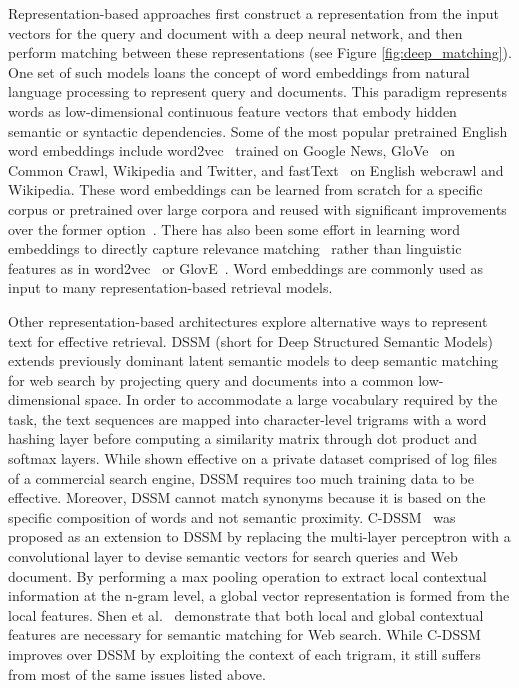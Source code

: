 Representation-based approaches first construct a representation from the input vectors for the query and document with a deep neural network, and then perform matching between these representations (see  Figure \ref{fig:deep_matching}).
One set of such models loans the concept of word embeddings from natural language processing to represent query and documents.
This paradigm represents words as low-dimensional continuous feature vectors that embody hidden semantic or syntactic dependencies.
Some of the most popular pretrained English word embeddings include word2vec~\cite{mikolov2013distributed} trained on  Google News, GloVe~\cite{pennington2014glove} on Common Crawl, Wikipedia and Twitter, and fastText~\cite{bojanowski2017enriching} on English webcrawl and Wikipedia.
These word embeddings can be learned from scratch for a specific corpus or pretrained over large corpora and reused with significant improvements over the former option~\cite{turian2010word}.
There has also been some effort in learning word embeddings to directly capture relevance matching~\cite{DBLP:journals/corr/ZamaniC17, ganguly2015word} rather than linguistic features as in word2vec~\cite{mikolov2013distributed} or GlovE~\cite{pennington2014glove}.
Word embeddings are commonly used as input to many representation-based retrieval models.

Other representation-based architectures explore alternative ways to represent text for effective retrieval.
DSSM (short for Deep Structured Semantic Models)~\cite{huang2013learning} extends previously dominant latent semantic models to deep semantic matching for web search by projecting query and documents into a common low-dimensional space.
In order to accommodate a large vocabulary required by the task, the text sequences are mapped into character-level trigrams with a word hashing layer before computing a similarity matrix through dot product and softmax layers.
While shown effective on a private dataset comprised of log files of a commercial search engine, DSSM requires too much training data to be effective.
Moreover, DSSM cannot match synonyms because it is based on the specific composition of words and not semantic proximity.
C-DSSM~\cite{shen2014learning} was proposed as an extension to DSSM by replacing the multi-layer perceptron with a convolutional layer to devise semantic vectors for search queries and Web document.
By performing a max pooling operation to extract local contextual information at the n-gram level, a global vector representation is formed from the local features.
Shen et al.~\cite{shen2014learning} demonstrate that both local and global contextual features are necessary for semantic matching for Web search.
While C-DSSM improves over DSSM by exploiting the context of each trigram, it still suffers from most of the same issues listed above.
\vfill

